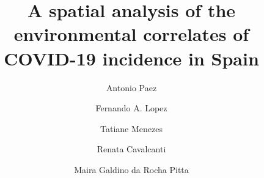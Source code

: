 \documentclass[]{elsarticle} %
\begin{document}
\begin{frontmatter}

  \title{A spatial analysis of the environmental correlates of COVID-19 incidence
in Spain}
    \author[McMaster University]{Antonio Paez}
    \author[Universidad Politecnica de Cartagena]{Fernando A. Lopez}
    \author[Departamento de Economia]{Tatiane Menezes}
    \author[Nucleo de Pesquisa]{Renata Cavalcanti}
    \author[Nucleo de Pesquisa]{Maira Galdino da Rocha Pitta}
      \address[McMaster University]{School of Geography and Earth Sciences, McMaster University, 1281 Main
St W, Hamilton, ON, L8S 4K1, Canada}
    \address[Universidad Politecnica de Cartagena]{Departamento de Metodos Cuantitativos, Ciencias Juridicas, y Lenguas
Modernas, Universidad Politecnica de Cartagena, Calle Real Numero 3,
30201, Cartagena, Murcia, Spain}
    \address[Departamento de Economia]{Departamento de Economia, Universidade Federal de Pernambuco, Av dos
Economistas, s/n - Cidade Universitária, Recife - PE, 50670-901, Brasil}
    \address[Nucleo de Pesquisa]{Núcleo de Pesquisa em Inovação Terapêutica NUPIT / UFPE, Av.
Prof.~Moraes Rego, 1235 - Cidade Universitária, Recife, PE, CEP
50670-901, Brazil}
  

\end{frontmatter}
\end{document}
